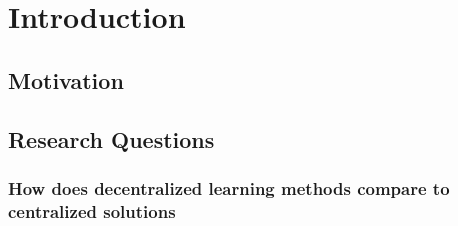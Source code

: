 \chapter{Introduction}

\section{Motivation}

\section{Research Questions}
\subsection{How does decentralized learning methods compare to centralized solutions}